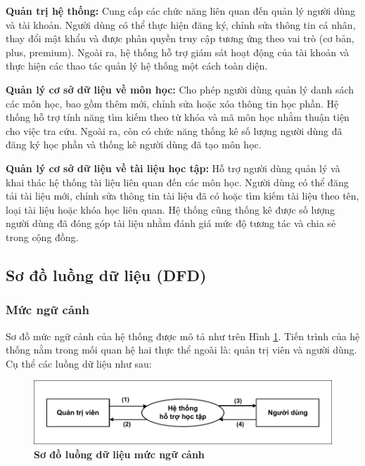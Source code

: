 \documentclass{article}
\begin{document}
	\textbf{Quản trị hệ thống:} Cung cấp các chức năng liên quan đến quản lý người dùng và tài khoản. Người dùng có thể thực hiện đăng ký, chỉnh sửa thông tin cá nhân, thay đổi mật khẩu và được phân quyền truy cập tương ứng theo vai trò (cơ bản, plus, premium). Ngoài ra, hệ thống hỗ trợ giám sát hoạt động của tài khoản và thực hiện các thao tác quản lý hệ thống một cách toàn diện.
	
	\textbf{Quản lý cơ sở dữ liệu về môn học:} Cho phép người dùng quản lý danh sách các môn học, bao gồm thêm mới, chỉnh sửa hoặc xóa thông tin học phần. Hệ thống hỗ trợ tính năng tìm kiếm theo từ khóa và mã môn học nhằm thuận tiện cho việc tra cứu. Ngoài ra, còn có chức năng thống kê số lượng người dùng đã đăng ký học phần và thống kê người dùng đã tạo môn học.
	
	\textbf{Quản lý cơ sở dữ liệu về tài liệu học tập:} Hỗ trợ người dùng quản lý và khai thác hệ thống tài liệu liên quan đến các môn học. Người dùng có thể đăng tải tài liệu mới, chỉnh sửa thông tin tài liệu đã có hoặc tìm kiếm tài liệu theo tên, loại tài liệu hoặc khóa học liên quan. Hệ thống cũng thống kê được số lượng người dùng đã đóng góp tài liệu nhằm đánh giá mức độ tương tác và chia sẻ trong cộng đồng.
	
	\subsection{Sơ đồ luồng dữ liệu (DFD)}
	
	\subsubsection{Mức ngữ cảnh}
	
	Sơ đồ mức ngữ cảnh của hệ thống được mô tả như trên Hình \ref{fig32}. Tiến trình của hệ thống nằm trong mối quan hệ hai thực thể ngoài là: quản trị viên và người dùng. Cụ thể các luồng dữ liệu như sau:
	\begin{figure}[!ht]
		\centering
		\includegraphics[trim= 10pt 10pt 10pt 10pt, clip, width=15cm]{dfd_fig32.pdf}
		\caption [Sơ đồ luồng dữ liệu mức ngữ cảnh]{\bfseries \fontsize{12pt}{0pt}\selectfont Sơ đồ luồng dữ liệu mức ngữ cảnh}
		\label{fig32}
	\end{figure}
	
\end{document}
